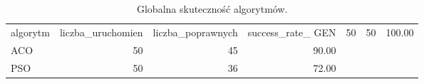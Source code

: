 \begin{table}
\caption{Globalna skuteczność algorytmów.}
\label{tab:success_rate}
\begin{tabular}{lrrr}
\toprule
algorytm & liczba_uruchomien & liczba_poprawnych & success_rate_%
\midrule
GEN & 50 & 50 & 100.00 \\
ACO & 50 & 45 & 90.00 \\
PSO & 50 & 36 & 72.00 \\
\bottomrule
\end{tabular}
\end{table}
